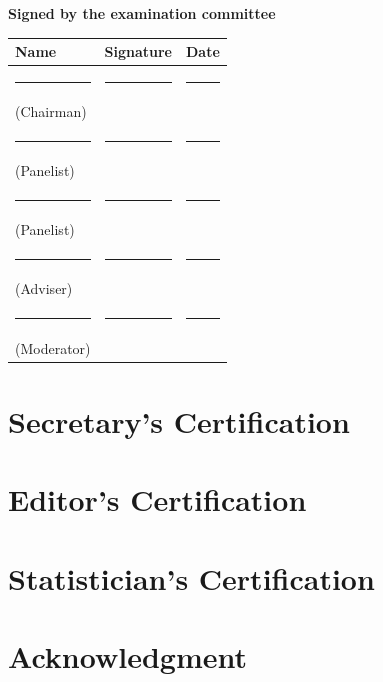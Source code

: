 \documentclass[12pt]{report}
\begin{document}
\vspace{1.5em}
\noindent\textbf{Signed by the examination committee}
\vspace{1.5em}

\noindent
\begin{tabular}{p{4.5cm} p{3.5cm} p{3cm}}
  \toprule
  \textbf{Name} & \textbf{Signature} & \textbf{Date} \\
  \midrule
  \rule{4cm}{0.4pt} & \rule{3cm}{0.4pt} & \rule{2.5cm}{0.4pt} \\
  (Chairman) & & \\[1.5em]
  \rule{4cm}{0.4pt} & \rule{3cm}{0.4pt} & \rule{2.5cm}{0.4pt} \\
  (Panelist) & & \\[1.5em]
  \rule{4cm}{0.4pt} & \rule{3cm}{0.4pt} & \rule{2.5cm}{0.4pt} \\
  (Panelist) & & \\[1.5em]
  \rule{4cm}{0.4pt} & \rule{3cm}{0.4pt} & \rule{2.5cm}{0.4pt} \\
  (Adviser) & & \\[1.5em]
  \rule{4cm}{0.4pt} & \rule{3cm}{0.4pt} & \rule{2.5cm}{0.4pt} \\
  (Moderator) & & \\
  \bottomrule
\end{tabular}
\vfill
\clearpage

\chapter*{\centering Secretary's Certification}
\clearpage

\chapter*{\centering Editor's Certification}
\clearpage

\chapter*{\centering Statistician's Certification}
\clearpage

\chapter*{\centering Acknowledgment}
\clearpage
\end{document}
